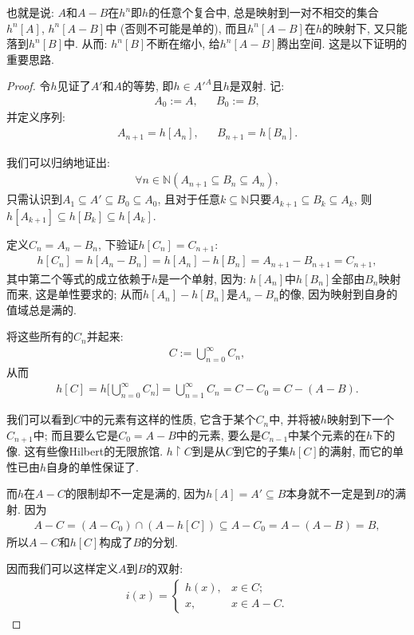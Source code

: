 \documentclass[UTF8,AutoFakeBold]{ctexart}
\theoremstyle{plain}
\theoremstyle{definition}
\begin{document}
也就是说: $A$和$A-B$在$h^n$即$h$的任意个复合中, 总是映射到一对不相交的集合$h^n[A]$, $h^n[A-B]$中 (否则不可能是单的), 而且$h^n[A-B]$在$h$的映射下, 又只能落到$h^n[B]$中. 
从而: $h^n[B]$不断在缩小, 给$h^n[A-B]$腾出空间. 
这是以下证明的重要思路.
\begin{proof}
令$h$见证了$A'$和$A$的等势, 即$h\in A'^A$且$h$是双射.
记:
\begin{align*}
	A_0 := A, && 
	B_0 := B,
\end{align*}
并定义序列:
\begin{align*}
	A_{n+1}=h[A_n], &&
	B_{n+1}=h[B_n].
\end{align*}

我们可以归纳地证出:
\begin{align*}
	\forall n\in \mathbb N(
		A_{n+1}\subseteq B_n \subseteq A_n),
\end{align*}
只需认识到$A_1\subseteq A' \subseteq B_0\subseteq A_0$, 
且对于任意$k\subseteq \mathbb N$只要$A_{k+1}\subseteq B_k \subseteq A_k$,
	则$h[A_{k+1}]\subseteq h[B_k]\subseteq  h[A_k]$.
	
定义$C_n = A_n - B_n$, 下验证$h[C_n] = C_{n+1}$: 
\begin{align*}
	h[C_n] = h[A_n - B_n] = h[A_n] - h[B_n] = A_{n+1} - B_{n+1} = C_{n+1}, 
\end{align*}
其中第二个等式的成立依赖于$h$是一个单射, 因为: $h[A_n] $中$h[B_n]$全部由$B_n$映射而来, 这是单性要求的; 从而$h[A_n]-h[B_n]$是$A_n-B_n$的像, 因为映射到自身的值域总是满的.

将这些所有的$C_n$并起来:
\begin{align*}
	C:=\bigcup^\infty_{n=0} C_n,
\end{align*}
从而
\begin{align*}
	h[C] = h\bigg\lbrack\bigcup^\infty_{n=0} C_n\bigg\rbrack = \bigcup^\infty_{n=1} C_n = C - C_0 = C- (A-B).
\end{align*}

我们可以看到$C$中的元素有这样的性质, 它含于某个$C_n$中, 并将被$h$映射到下一个$C_{n+1}$中; 而且要么它是$C_0=A-B$中的元素, 要么是$C_{n-1}$中某个元素的在$h$下的像. 这有些像Hilbert的无限旅馆. $h\upharpoonright C$到是从$C$到它的子集$h[C]$的满射, 而它的单性已由$h$自身的单性保证了. 

而$h$在$A-C$的限制却不一定是满的, 因为$h[A]=A'\subseteq B$本身就不一定是到$B$的满射. 因为
\begin{align*}
	A-C = (A - C_0) \cap (A-h[C]) \subseteq A-C_0 = A-(A-B) =B,
\end{align*}
所以$A-C$和$h[C]$构成了$B$的分划.

因而我们可以这样定义$A$到$B$的双射:
\begin{align*}
	i(x)=
	\begin{cases}
	h(x), & x\in C;\\
	x, & x\in A-C.
	\end{cases}
\end{align*}
\end{proof}
\end{document}
